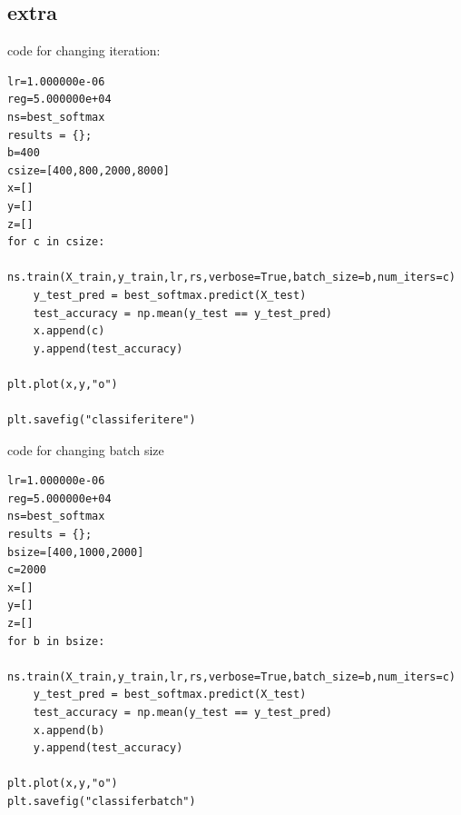 \documentclass[pdftex,11pt]{article}
\begin{document}
\subsection{extra}
code for changing iteration:
\begin{lstlisting}  
lr=1.000000e-06 
reg=5.000000e+04
ns=best_softmax
results = {};
b=400
csize=[400,800,2000,8000]
x=[]
y=[]
z=[]
for c in csize:
    ns.train(X_train,y_train,lr,rs,verbose=True,batch_size=b,num_iters=c)
    y_test_pred = best_softmax.predict(X_test)
    test_accuracy = np.mean(y_test == y_test_pred)
    x.append(c)
    y.append(test_accuracy)
    
plt.plot(x,y,"o")

plt.savefig("classiferitere")
\end{lstlisting}  

code for changing batch size
\begin{lstlisting} 
lr=1.000000e-06 
reg=5.000000e+04
ns=best_softmax
results = {};
bsize=[400,1000,2000]
c=2000
x=[]
y=[]
z=[]
for b in bsize:
    ns.train(X_train,y_train,lr,rs,verbose=True,batch_size=b,num_iters=c)
    y_test_pred = best_softmax.predict(X_test)
    test_accuracy = np.mean(y_test == y_test_pred)
    x.append(b)
    y.append(test_accuracy)
    
plt.plot(x,y,"o")
plt.savefig("classiferbatch")
\end{lstlisting} 
\end{document}
